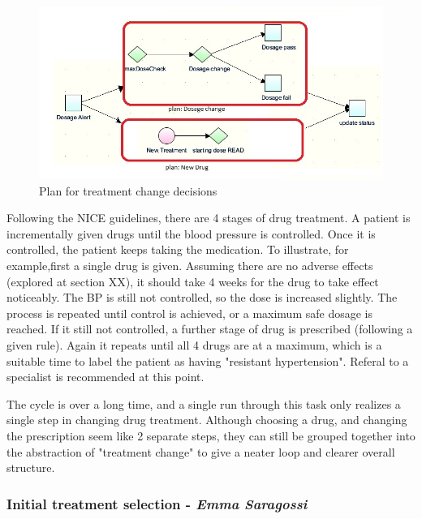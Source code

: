 \documentclass[11pt]{article}
\begin{document}
\begin{figure}[ht]
\begin{center}
\includegraphics[scale=0.9]{tallisTreatmentChange}
\caption{Plan for treatment change decisions }
\label{fig:tallisTreatmentChange}
\end{center}
\end{figure}

Following the NICE guidelines, there are 4 stages of drug treatment.  A patient is incrementally given drugs until the blood pressure is controlled.  Once it is controlled, the patient keeps taking the medication. To illustrate, for example,first a single drug is given.  Assuming there are no adverse effects (explored at section XX), it should take 4 weeks for the drug to take effect noticeably.  The BP is still not controlled, so the dose is increased slightly.  The process is repeated until control is achieved, or a maximum safe dosage is reached.  If it still not controlled, a further stage of drug is prescribed (following a given rule). Again it repeats until all 4 drugs are at a maximum, which is a suitable time to label the patient as having "resistant hypertension". Referal to a specialist is recommended at this point.  

The cycle is over a long time, and a single run through this task only realizes a single step in changing drug treatment.  Although choosing a drug, and changing the prescription seem like 2 separate steps, they can still be grouped together into the abstraction of  "treatment change" to give a neater loop and clearer overall structure.

\subsubsection{Initial treatment selection - \textit{Emma Saragossi}}
\label{sec:Treatment}
\end{document}
